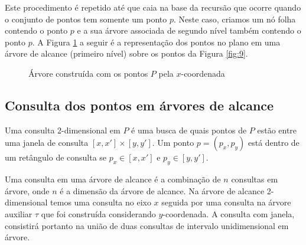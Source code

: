 Este procedimento é repetido até que caia na base da recursão que ocorre quando o conjunto de pontos tem somente um ponto $p$. Neste caso, criamos um nó folha contendo o ponto $p$ e a sua árvore associada de segundo nível também contendo o ponto $p$. A Figura \ref{fig:11} a seguir é a representação dos pontos no plano em uma árvore de alcance (primeiro nível) sobre os pontos da Figura \ref{fig:9}.%

\begin{figure}[h!]

 \caption{Árvore construída com os pontos $P$ pela $x$-coordenada}
 \label{fig:11}
\end{figure}

\subsection{Consulta dos pontos em árvores de alcance}

Uma consulta 2-dimensional em $P$ é uma busca de quais pontos de $P$ estão entre uma janela de consulta
$[x, x'] \times [y, y']$. Um ponto $p = (p_x, p_y)$ está dentro de um retângulo de consulta se $p_x \in [x, x']$ e $p_y \in [y, y']$. %

Uma consulta em uma árvore de alcance é a combinação de $n$ consultas em árvore, onde $n$ é a dimensão
da árvore de alcance.
Na árvore de alcance 2-dimensional temos uma consulta no eixo $x$ seguida por uma consulta na árvore 
auxiliar $\tau$ que foi construída considerando $y$-coordenada. A consulta com janela, consistirá portanto na união de duas consultas de intervalo unidimensional em
árvore.

